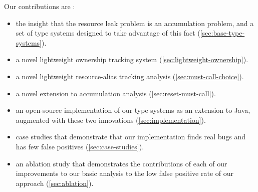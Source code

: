 Our contributions are :
\begin{itemize}
\item the insight that the resource leak problem is an accumulation problem,
  and a set of type systems designed to take advantage of this fact (\cref{sec:base-type-systems}).
\item a novel lightweight ownership tracking system (\cref{sec:lightweight-ownership}).
\item a novel lightweight resource-alias tracking analysis (\cref{sec:must-call-choice}).
\item a novel extension to accumulation analysis (\cref{sec:reset-must-call}).
\item an open-source implementation of our type systems as an extension to Java,
  augmented with these two innovations (\cref{sec:implementation}).
\item case studies that demonstrate that our implementation finds real
  bugs and has few false positives (\cref{sec:case-studies}).
\item an ablation study that demonstrates the contributions of
  each of our improvements to our basic analysis to the low false
  positive rate of our approach (\cref{sec:ablation}).
\end{itemize}
  
